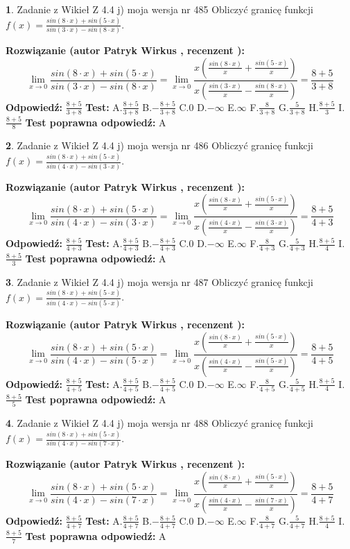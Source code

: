 \documentclass[12pt, a4paper]{article}
\theoremstyle{definition} %
\newtheorem{zad}{}
\newcommand{\zadStart}[1]{\begin{zad}#1\newline}
\newcommand{\zadStop}{\end{zad}}
\newcommand{\rozwStart}[2]{\noindent \textbf{Rozwiązanie (autor #1 , recenzent #2): }\newline}
\newcommand{\rozwStop}{\newline}
\newcommand{\odpStart}{\noindent \textbf{Odpowiedź:}\newline}
\newcommand{\odpStop}{\newline}
\newcommand{\testStart}{\noindent \textbf{Test:}\newline}
\newcommand{\testStop}{\newline}
\newcommand{\kluczStart}{\noindent \textbf{Test poprawna odpowiedź:}\newline}
\newcommand{\kluczStop}{\newline}
\begin{document}
\zadStart{Zadanie z Wikieł Z 4.4 j) moja wersja nr 485}
Obliczyć granicę funkcji $f(x)=\frac{sin(8\cdot x) +sin(5\cdot x)}{sin(3\cdot x) -sin(8\cdot x)}$.
\zadStop
\rozwStart{Patryk Wirkus}{}
$$\lim\limits_{x\to 0}\frac{sin(8\cdot x) +sin(5\cdot x)}{sin(3\cdot x) -sin(8\cdot x)}=\lim\limits_{x\to 0}\frac{x(\frac{sin(8\cdot x)}{x}+\frac{sin(5\cdot x)}{x})}{x(\frac{sin(3\cdot x)}{x}-\frac{sin(8\cdot x)}{x})}=\frac{8+5}{3+8}$$
\rozwStop
\odpStart
$\frac{8+5}{3+8}$
\odpStop
\testStart
A.$\frac{8+5}{3+8}$
B.$-\frac{8+5}{3+8}$
C.$0$
D.$-\infty$
E.$\infty$
F.$\frac{8}{3+8}$
G.$\frac{5}{3+8}$
H.$\frac{8+5}{3}$
I.$\frac{8+5}{8}$
\testStop
\kluczStart
A
\kluczStop



\zadStart{Zadanie z Wikieł Z 4.4 j) moja wersja nr 486}
Obliczyć granicę funkcji $f(x)=\frac{sin(8\cdot x) +sin(5\cdot x)}{sin(4\cdot x) -sin(3\cdot x)}$.
\zadStop
\rozwStart{Patryk Wirkus}{}
$$\lim\limits_{x\to 0}\frac{sin(8\cdot x) +sin(5\cdot x)}{sin(4\cdot x) -sin(3\cdot x)}=\lim\limits_{x\to 0}\frac{x(\frac{sin(8\cdot x)}{x}+\frac{sin(5\cdot x)}{x})}{x(\frac{sin(4\cdot x)}{x}-\frac{sin(3\cdot x)}{x})}=\frac{8+5}{4+3}$$
\rozwStop
\odpStart
$\frac{8+5}{4+3}$
\odpStop
\testStart
A.$\frac{8+5}{4+3}$
B.$-\frac{8+5}{4+3}$
C.$0$
D.$-\infty$
E.$\infty$
F.$\frac{8}{4+3}$
G.$\frac{5}{4+3}$
H.$\frac{8+5}{4}$
I.$\frac{8+5}{3}$
\testStop
\kluczStart
A
\kluczStop



\zadStart{Zadanie z Wikieł Z 4.4 j) moja wersja nr 487}
Obliczyć granicę funkcji $f(x)=\frac{sin(8\cdot x) +sin(5\cdot x)}{sin(4\cdot x) -sin(5\cdot x)}$.
\zadStop
\rozwStart{Patryk Wirkus}{}
$$\lim\limits_{x\to 0}\frac{sin(8\cdot x) +sin(5\cdot x)}{sin(4\cdot x) -sin(5\cdot x)}=\lim\limits_{x\to 0}\frac{x(\frac{sin(8\cdot x)}{x}+\frac{sin(5\cdot x)}{x})}{x(\frac{sin(4\cdot x)}{x}-\frac{sin(5\cdot x)}{x})}=\frac{8+5}{4+5}$$
\rozwStop
\odpStart
$\frac{8+5}{4+5}$
\odpStop
\testStart
A.$\frac{8+5}{4+5}$
B.$-\frac{8+5}{4+5}$
C.$0$
D.$-\infty$
E.$\infty$
F.$\frac{8}{4+5}$
G.$\frac{5}{4+5}$
H.$\frac{8+5}{4}$
I.$\frac{8+5}{5}$
\testStop
\kluczStart
A
\kluczStop



\zadStart{Zadanie z Wikieł Z 4.4 j) moja wersja nr 488}
Obliczyć granicę funkcji $f(x)=\frac{sin(8\cdot x) +sin(5\cdot x)}{sin(4\cdot x) -sin(7\cdot x)}$.
\zadStop
\rozwStart{Patryk Wirkus}{}
$$\lim\limits_{x\to 0}\frac{sin(8\cdot x) +sin(5\cdot x)}{sin(4\cdot x) -sin(7\cdot x)}=\lim\limits_{x\to 0}\frac{x(\frac{sin(8\cdot x)}{x}+\frac{sin(5\cdot x)}{x})}{x(\frac{sin(4\cdot x)}{x}-\frac{sin(7\cdot x)}{x})}=\frac{8+5}{4+7}$$
\rozwStop
\odpStart
$\frac{8+5}{4+7}$
\odpStop
\testStart
A.$\frac{8+5}{4+7}$
B.$-\frac{8+5}{4+7}$
C.$0$
D.$-\infty$
E.$\infty$
F.$\frac{8}{4+7}$
G.$\frac{5}{4+7}$
H.$\frac{8+5}{4}$
I.$\frac{8+5}{7}$
\testStop
\kluczStart
A
\kluczStop
\end{document}
